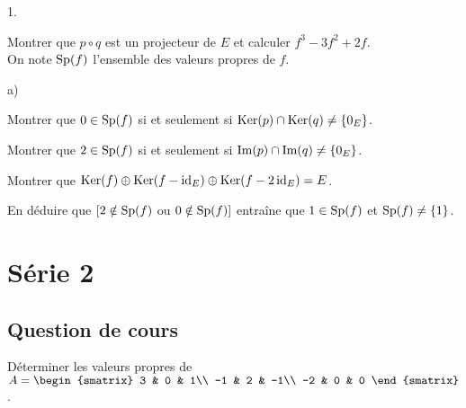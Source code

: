 \documentclass[11pt]{article}%
\begin{document}
\begin{noliste}{1.}
\item
Montrer que $p\circ q$ est un projecteur de $E$ et calculer
$f^3-3f^2+2f$.\\
On note $\operatorname{Sp}(f)$ l'ensemble des valeurs propres de $f$.

\item
\begin{noliste}{a)}
\item
 Montrer que $0\in\operatorname{Sp}(f)$ si et seulement si $\operatorname{Ker}(p)\cap\operatorname{Ker}(q) \neq 
 \{0_E\}$.

\item
Montrer que $2\in\operatorname{Sp}(f)$ si et seulement si $\operatorname{Im}(p)\cap \operatorname{Im}(q)\neq 
\{0_E\}$.

\item
Montrer que $\operatorname{Ker}(f)\oplus \operatorname{Ker}(f- {\rm{id}}_E)\oplus\operatorname{Ker}(f-2 \, {\rm{id}}_E)=E$.

\end{noliste}

\item
En déduire que $[2\notin\operatorname{Sp}(f)$ ou $0\notin\operatorname{Sp} (f)]$
entraîne
que $1\in\operatorname{Sp}(f)$ et $\operatorname{Sp}(f)\neq\{1\}$.
\end{noliste}



\newpage

\section*{Série 2}
\subsection*{Question de cours}
\noindent
Déterminer les valeurs propres de $A=
\begin{smatrix}
 3 & 0 & 1\\
 -1 & 2 & -1\\
 -2 & 0 & 0
\end{smatrix}$.
\end{document}
